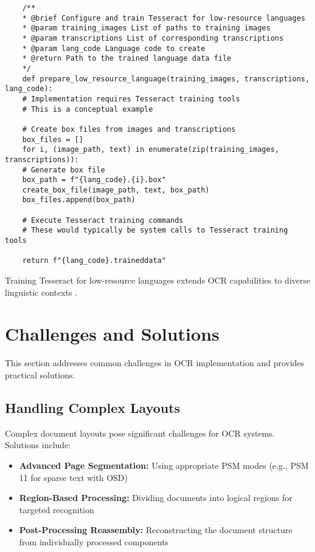 \begin{verbatim}
	/**
	* @brief Configure and train Tesseract for low-resource languages
	* @param training_images List of paths to training images
	* @param transcriptions List of corresponding transcriptions
	* @param lang_code Language code to create
	* @return Path to the trained language data file
	*/
	def prepare_low_resource_language(training_images, transcriptions, lang_code):
	# Implementation requires Tesseract training tools
	# This is a conceptual example
	
	# Create box files from images and transcriptions
	box_files = []
	for i, (image_path, text) in enumerate(zip(training_images, transcriptions)):
	# Generate box file
	box_path = f"{lang_code}.{i}.box"
	create_box_file(image_path, text, box_path)
	box_files.append(box_path)
	
	# Execute Tesseract training commands
	# These would typically be system calls to Tesseract training tools
	
	return f"{lang_code}.traineddata"
\end{verbatim}

Training Tesseract for low-resource languages extends OCR capabilities to diverse linguistic contexts \cite{Anitha:2024}.

\section{Challenges and Solutions}
\label{sec:challenges}

This section addresses common challenges in OCR implementation and provides practical solutions.

\subsection{Handling Complex Layouts}
\label{subsec:complex_layouts}

Complex document layouts pose significant challenges for OCR systems. Solutions include:

\begin{itemize}
	\item \textbf{Advanced Page Segmentation:} Using appropriate PSM modes (e.g., PSM 11 for sparse text with OSD)
	\item \textbf{Region-Based Processing:} Dividing documents into logical regions for targeted recognition
	\item \textbf{Post-Processing Reassembly:} Reconstructing the document structure from individually processed components
\end{itemize}

